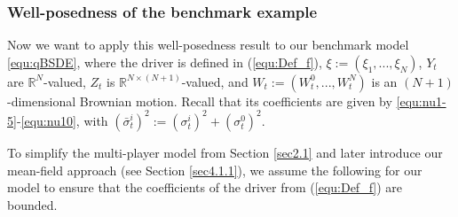 \documentclass[10pt,a4paper]{article}
\theoremstyle{plain}
\theoremstyle{definition}
\numberwithin{equation}{section}
\begin{document}

\subsubsection{Well-posedness of the benchmark example}\label{sec:3.1.1}

Now we want to apply this well-posedness result to our benchmark model \eqref{equ:qBSDE}, where 
the driver is defined in (\ref{equ:Def_f}), $\xi := (\xi_{1},...,\xi_{N})$, $Y_{t}$ are $\mathbb{R}^{N}$-valued, $Z_{t}$ is $\mathbb{R}^{N \times (N+1)}$-valued, and $W_{t} := (W^{0}_{t},...,W^{N}_{t})$ is an $(N+1)$-dimensional Brownian motion. Recall that its coefficients are given by \eqref{equ:nu1-5}-\eqref{equ:nu10}, with $(\bar{\sigma}_{t}^{i})^{2} := (\sigma_{t}^{i})^{2} + (\sigma_{t}^{0})^{2}$. 


To simplify the multi-player model from Section \ref{sec2.1} and later introduce our mean-field approach (see Section \ref{sec4.1.1}), we assume the following for our model to ensure that the coefficients of the driver from (\ref{equ:Def_f}) are bounded.
\end{document}
